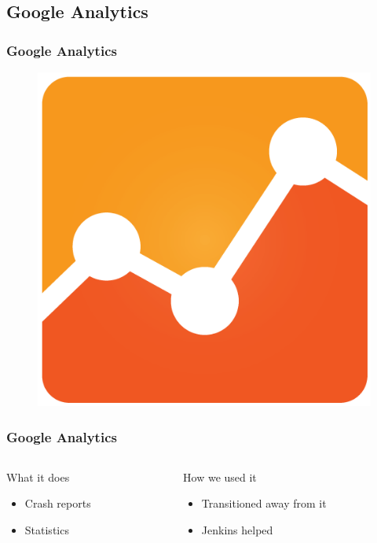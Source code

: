 \subsection{Google Analytics}
\begin{frame}
	\frametitle{Google Analytics}
	\begin{figure}[H]
		\centering
		\includegraphics[width= 0.5 \textwidth]{pictures/analytics_icon.png}
	\end{figure}
\end{frame}

\begin{frame}
	\begin{center}
		\frametitle{Google Analytics}
		\begin{columns}[T] %
			\begin{column}{.3\textwidth}
				What it does
				\begin{itemize}
					\item Crash reports
					\item Statistics
				\end{itemize}
			\end{column}%
			\begin{column}{.3\textwidth}
				How we used it
				\begin{itemize}
					\item Transitioned away from it 
					\item Jenkins helped
				\end{itemize}
			\end{column}%
		\end{columns}
	\end{center}
\end{frame}

